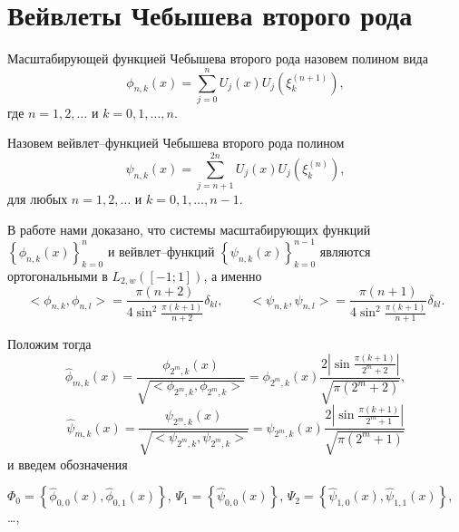 \section{Вейвлеты Чебышева второго рода}


\begin{definition}
Масштабирующей функцией Чебышева второго рода назовем полином вида
\begin{equation*}
\label{scaling}
\phi_{n,k}(x) = \sum\limits_{j=0}^{n}U_{j}(x)U_{j}(\xi_{k}^{(n+1)}),
\end{equation*}
где
$n=1,2,\ldots$ и $k=0,1,\ldots,n$.
\end{definition}

\begin{definition}
Назовем вейвлет--функцией Чебышева второго рода полином
\begin{equation*}
\label{sms1wavelet}
\psi_{n,k}(x) = \sum\limits_{j=n+1}^{2n}U_{j}(x)U_{j}(\xi_{k}^{(n)}),
\end{equation*}
для любых
$n=1,2,\ldots$ и $k=0,1,\ldots,n-1$.
\end{definition}

В работе \cite{sms11}
нами доказано, что системы масштабирующих функций  $\left\{ \phi_{n,k}(x)\right\}_{k=0}^{n}$ и
вейвлет--функций $\left\{ \psi_{n,k}(x)\right\}_{k=0}^{n-1}$ являются ортогональными в $L_{2, w}([-1; 1])$, а именно
\begin{equation*}
<\phi_{n,k}, \phi_{n,l}> =
\frac{\pi(n+2)}{4\sin^2{\frac{\pi(k+1)}{n+2}}} \delta_{kl}, \qquad <\psi_{n,k}, \psi_{n,l}> =
\frac{\pi(n+1)}{4\sin^2{\frac{\pi(k+1)}{n+1}}} \delta_{kl}.
\end{equation*}

Положим тогда
\begin{equation*}
\hat{\phi}_{m,k}(x) = \frac{\phi_{2^m,k}(x)}{\sqrt{<\phi_{2^m,k}, \phi_{2^m,k}>}} = \phi_{2^m,k}(x)   \frac{2\left|\sin{\frac{\pi(k+1)}{2^m+2}}\right|}{\sqrt{\pi(2^m+2)}},
\end{equation*}
\begin{equation*}
\hat{\psi}_{m,k}(x) = \frac{\psi_{2^m,k}(x)}{\sqrt{<\psi_{2^m,k}, \psi_{2^m,k}>}} = \psi_{2^m,k}(x)   \frac{2\left| \sin{\frac{\pi(k+1)}{2^m+1}}\right|}{\sqrt{\pi(2^m+1)}}
\end{equation*}
и введем обозначения

$\Phi_{0} = \left\{\hat{\phi}_{0,0}(x), \hat{\phi}_{0,1}(x) \right\}$,
$\Psi_{1} =  \left\{\hat{\psi}_{0,0}(x) \right\}$,
$\Psi_{2} =  \left\{\hat{\psi}_{1,0}(x), \hat{\psi}_{1,1}(x) \right\}$, \ldots ,


